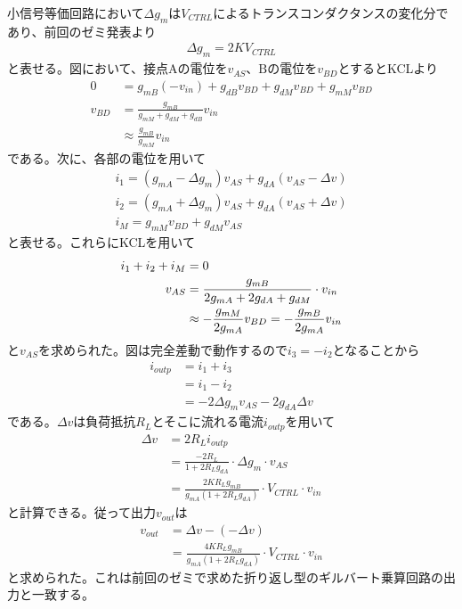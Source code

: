 \documentclass[twocolumn]{jsarticle}
\begin{document}
    小信号等価回路において$\Delta g_{m}$は$V_{CTRL}$によるトランスコンダクタンスの変化分であり、前回のゼミ発表より
    \begin{align}
        \Delta g_{m}=2KV_{CTRL}     \label{eq:delta_gm}
    \end{align}
    と表せる。図において、接点$\mathrm{A}$の電位を$v_{AS}$、$\mathrm{B}$の電位を$v_{BD}$とするとKCLより
    \begin{align*}
        0 &= g_{mB}(-v_{in})+g_{dB}v_{BD}+g_{dM}v_{BD}+g_{mM}v_{BD}       \\
        v_{BD} &=\frac{g_{mB}}{g_{mM}+g_{dM}+g_{dB}}v_{in}              \\
        &\approx\frac{g_{mB}}{g_{mM}}v_{in}
    \end{align*}
    である。次に、各部の電位を用いて
    \begin{gather*}
        i_{1} = (g_{mA}-\Delta g_{m})v_{AS}+g_{dA}(v_{AS}-\Delta v)     \\
        i_{2} = (g_{mA}+\Delta g_{m})v_{AS}+g_{dA}(v_{AS}+\Delta v)     \\
        i_{M} = g_{mM}v_{BD}+g_{dM}v_{AS}
    \end{gather*}
    と表せる。これらにKCLを用いて
    \begin{align}
        i_{1}+i_{2}+i_{M} &= 0      \notag\\
        v_{AS} &= \frac{g_{mB}}{2g_{mA}+2g_{dA}+g_{dM}}\cdot v_{in}    \notag\\
        &\approx-\frac{g_{mM}}{2g_{mA}}v_{BD} = -\frac{g_{mB}}{2g_{mA}}v_{in}   \label{eq:vas}
    \end{align}
    と$v_{AS}$を求められた。図は完全差動で動作するので$i_{3}=-i_{2}$となることから
    \begin{align*}
        i_{outp} &= i_{1}+i_{3}     \\
        &= i_{1}-i_{2}              \\
        &= -2\Delta g_{m}v_{AS}-2g_{dA}\Delta v
    \end{align*}
    である。$\Delta v$は負荷抵抗$R_{L}$とそこに流れる電流$i_{outp}$を用いて
    \begin{align*}
        \Delta v &= 2R_{L}i_{outp}      \\
        &= \frac{-2R_{L}}{1+2R_{L}g_{dA}}\cdot\Delta g_{m}\cdot v_{AS}  \\
        &= \frac{2KR_{L}g_{mB}}{g_{mA}(1+2R_{L}g_{dA})}\cdot V_{CTRL}\cdot v_{in}
    \end{align*}
    と計算できる。従って出力$v_{out}$は
    \begin{align}
        v_{out} &= \Delta v - (-\Delta v)   \\
        &= \frac{4KR_{L}g_{mB}}{g_{mA}(1+2R_{L}g_{dA})}\cdot V_{CTRL}\cdot v_{in}   \label{eq:vout_NtoN}
    \end{align}
    と求められた。これは前回のゼミで求めた折り返し型のギルバート乗算回路の出力と一致する。
    \newpage
\end{document}
